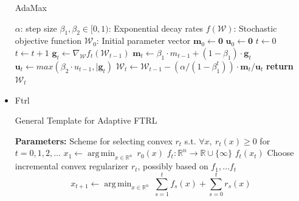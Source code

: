 \documentclass{article}
\DeclareMathOperator*{\argmin}{arg\,min}
\newcommand{\R}{\ensuremath{\mathbb{R}}}
\newcommand{\ti}{_{t+1}}
\begin{document}
\begin{itemize}
        \begin{algorithm}[H]
            \caption{AdaMax}
            \begin{algorithmic}[1]
                \Require $\alpha$: step size
                \Require $\beta_1, \beta_2 \in [0,1)$: Exponential decay rates
                \Require $f(\mathcal{W})$: Stochastic objective function
                \Require $\mathcal{W}_0$: Initial parameter vector
                \State $\bm{m}_0 \gets \bm{0}$ 
                \State $\bm{u}_0 \gets \bm{0}$ 
                \State $t \gets 0$ 
                    \State $t\gets t+1$
                    \State $\bm{g}_t \gets \nabla_{\mathcal{W}}f_t(\mathcal{W}_{t-1})$ 
                    \State $\bm{m}_t \gets \beta_1 \cdot m_{t-1} + (1-\beta_1) \cdot \bm{g}_t$ 
                    \State $\bm{u}_t \gets max(\beta_2 \cdot u_{t-1}, \vert{\bm{g}_t})$ 
                    \State $\mathcal{W}_t \gets \mathcal{W}_{t-1} - (\alpha/ (1-\beta_1^t)) \cdot \bm{m}_t/\bm{u}_t$ 
                \EndWhile
                \State \textbf{return} $\mathcal{W}_t$ 
            \end{algorithmic}
        \end{algorithm}

        \item Ftrl

        \begin{algorithm}[H]
            \caption{General Template for Adaptive FTRL}
            \begin{algorithmic}
                \State \textbf{Parameters:} Scheme for selecting convex $r_t$ s.t. $\forall x,\ r_t(x) \ge 0$ for $t=0,1,2, \dots$
                \State $x_1 \leftarrow \argmin_{x \in \R^n}\ r_0(x)$
                    \State $f_t: \R^n \rightarrow \R \cup \{\infty\}$ 
                    \State $f_t(x_t)$ 
                    \State Choose incremental convex regularizer $r_t$, possibly based on $f_1, \dots f_t$
                    \State \[x\ti \leftarrow \argmin_{x \in \R^n}\ \sum_{s=1}^t f_s(x) + \sum_{s=0}^t r_s(x)\] 
                \EndFor
            \end{algorithmic}
        \end{algorithm}

    \end{itemize}
\end{document}
